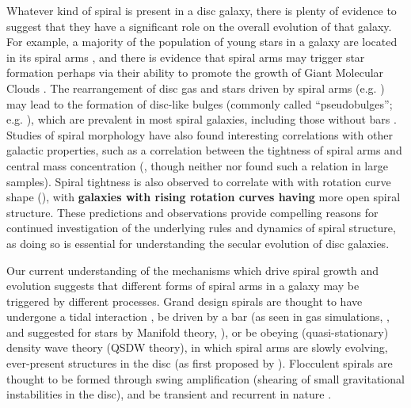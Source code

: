 Whatever kind of spiral is present in a disc galaxy, there is plenty of evidence to suggest that they have a significant role on the overall evolution of that galaxy. For example, a majority of the population of young stars in a galaxy are located in its spiral arms \citep{2011EAS....51...19E}, and there is evidence that spiral arms may trigger star formation \citep{2013A&A...560A..59C} perhaps via their ability to promote the growth of Giant Molecular Clouds \citep{2014IAUS..298..221D}. The rearrangement of disc gas and stars driven by spiral arms (e.g. \citealt{2018MNRAS.476.1561D}) may lead to the formation of disc-like bulges (commonly called ``pseudobulges''; e.g. \citealt{2004ARA&A..42..603K}), which are prevalent in most spiral galaxies, including those without bars \citep{2010ApJ...716..942F}. Studies of spiral morphology have also found interesting correlations with other galactic properties, such as a correlation between the tightness of spiral arms and central mass concentration (\citealt{2019ApJ...871..194Y}, though neither \citealt{2017MNRAS.472.2263H} nor \citealt{2019MNRAS.487.1808M} found such a relation in large samples). Spiral tightness is also observed to correlate with with rotation curve shape (\citealt{2005MNRAS.359.1065S}), with \textbf{galaxies with rising rotation curves having} more open spiral structure. These predictions and observations provide compelling reasons for continued investigation of the underlying rules and dynamics of spiral structure, as doing so is essential for understanding the secular evolution of disc galaxies.

Our current understanding of the mechanisms which drive spiral growth and evolution suggests that different forms of spiral arms in a galaxy may be triggered by different processes. Grand design spirals are thought to have undergone a tidal interaction \citep{2010MNRAS.403..625D,2017ApJ...834....7S}, be driven by a bar (as seen in gas simulations, \citealt{1976ApJ...209...53S,2008A&A...489..115R}, and suggested for stars by Manifold theory, \citealt{2006A&A...453...39R,2009MNRAS.394...67A,2009MNRAS.400.1706A}), or be obeying (quasi-stationary) density wave theory (QSDW theory), in which spiral arms are slowly evolving, ever-present structures in the disc (as first proposed by \citealt{1964ApJ...140..646L}). Flocculent spirals are thought to be formed through swing amplification (shearing of small gravitational instabilities in the disc), and be transient and recurrent in nature \citep{1966ApJ...146..810J}.

